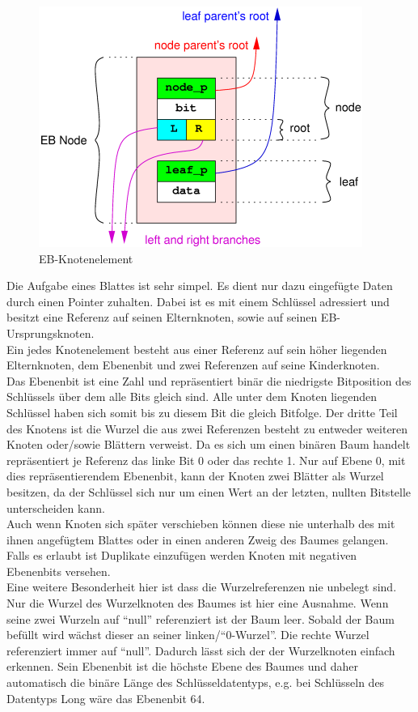 \documentclass[a4paper,11pt,oneside,%
headsepline,												%
footsepline,												%
bibtotocnumbered									%
]{scrreprt}
\begin{document}
\begin{figure}
  \begin{center}
    \includegraphics[width=.6\linewidth]{bilder/Ebnode.png}
  \end{center}
 \caption{EB-Knotenelement}
\end{figure}
Die Aufgabe eines Blattes ist sehr simpel. Es dient nur dazu eingefügte Daten durch einen Pointer zuhalten. Dabei ist es mit einem Schlüssel adressiert und besitzt eine Referenz auf seinen Elternknoten, sowie auf seinen EB-Ursprungsknoten.\\

Ein jedes Knotenelement besteht aus einer Referenz auf sein höher liegenden Elternknoten, dem Ebenenbit  und zwei Referenzen auf seine Kinderknoten. \\ Das Ebenenbit ist eine Zahl und repräsentiert binär die niedrigste Bitposition des Schlüssels über dem alle Bits gleich sind. Alle unter dem Knoten liegenden Schlüssel haben sich somit bis zu diesem Bit die gleich Bitfolge. Der dritte Teil des Knotens ist die Wurzel die aus zwei Referenzen besteht zu entweder weiteren Knoten oder/sowie Blättern verweist. Da es sich um einen binären Baum handelt repräsentiert je Referenz das linke Bit 0 oder das rechte 1. Nur auf Ebene 0, mit dies repräsentierendem Ebenenbit, kann der Knoten zwei Blätter als Wurzel besitzen, da der Schlüssel sich nur um einen Wert an der letzten, nullten Bitstelle unterscheiden kann.\\
Auch wenn Knoten sich später verschieben können diese nie unterhalb des mit ihnen angefügtem Blattes oder in einen anderen Zweig des Baumes gelangen. Falls es erlaubt ist Duplikate einzufügen werden  Knoten mit negativen Ebenenbits versehen.\\

Eine weitere Besonderheit hier ist dass die Wurzelreferenzen nie unbelegt sind. Nur die Wurzel des Wurzelknoten des Baumes ist hier eine Ausnahme. Wenn seine zwei Wurzeln auf \enquote{null} referenziert ist der Baum leer. Sobald der Baum befüllt wird wächst dieser an seiner linken/\enquote{0-Wurzel}. Die rechte Wurzel referenziert immer auf \enquote{null}. Dadurch lässt sich der der Wurzelknoten einfach erkennen.
Sein Ebenenbit ist die höchste Ebene des Baumes und daher automatisch die binäre Länge des Schlüsseldatentyps, e.g. bei Schlüsseln des Datentyps Long wäre das Ebenenbit 64.\\
\end{document}

